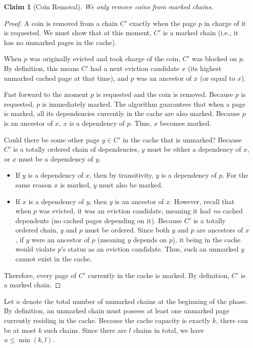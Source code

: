 \documentclass[a4paper]{article}
\newtheorem{claim}{Claim}      %
\begin{document}
\begin{claim}[Coin Removal]
\label{claim:coin_removal}
We only remove coins from marked chains. 
\end{claim}
\begin{proof}
A coin is removed from a chain $C'$ exactly when the page $p$ in charge of it is requested. We must show that at this moment, $C'$ is a marked chain (i.e., it has no unmarked pages in the cache).

When $p$ was originally evicted and took charge of the coin, $C'$ was blocked on $p$. By definition, this means $C'$ had a next eviction candidate $x$ (its highest unmarked cached page at that time), and $p$ was an ancestor of $x$ (or equal to $x$).

Fast forward to the moment $p$ is requested and the coin is removed. Because $p$ is requested, $p$ is immediately marked. The algorithm guarantees that when a page is marked, all its dependencies currently in the cache are also marked. Because $p$ is an ancestor of $x$, $x$ is a dependency of $p$. Thus, $x$ becomes marked.

Could there be some other page $y \in C'$ in the cache that is unmarked? Because $C'$ is a totally ordered chain of dependencies, $y$ must be either a dependency of $x$, or $x$ must be a dependency of $y$.
\begin{itemize}
    \item If $y$ is a dependency of $x$, then by transitivity, $y$ is a dependency of $p$. For the same reason $x$ is marked, $y$ must also be marked.
    \item If $x$ is a dependency of $y$, then $y$ is an ancestor of $x$. However, recall that when $p$ was evicted, it was an eviction candidate, meaning it had \textit{no} cached dependents (no cached pages depending on it). Because $C'$ is a totally ordered chain, $y$ and $p$ must be ordered. Since both $y$ and $p$ are ancestors of $x$, if $y$ were an ancestor of $p$ (meaning $y$ depends on $p$), it being in the cache would violate $p$'s status as an eviction candidate. Thus, such an unmarked $y$ cannot exist in the cache.
\end{itemize}
Therefore, every page of $C'$ currently in the cache is marked. By definition, $C'$ is a marked chain.
\end{proof}

Let $u$ denote the total number of unmarked chains at the beginning of the phase. By definition, an unmarked chain must possess at least one unmarked page currently residing in the cache. Because the cache capacity is exactly $k$, there can be at most $k$ such chains. Since there are $l$ chains in total, we have $u \le \min(k, l)$. 
\end{document}
